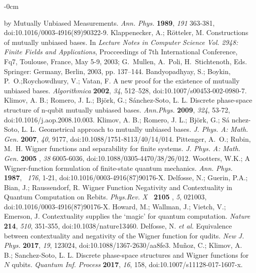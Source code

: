 \documentclass[quantumrep,article,submit,pdftex,moreauthors]{Definitions/mdpi}
\begin{document}
\begin{adjustwidth}{-\extralength}{0cm}
\begin{thebibliography}{999}
by Mutually Unbiased Measurements. \textit{Ann. Phys.} \textbf{1989}, 
\textit{191} 363-381, doi:10.1016/0003-4916(89)90322-9.
 Klappenecker, A.; R{\"{o}}tteler, M. Constructions of
mutually unbiased bases. In \textit{Lecture Notes in Computer Science Vol.
2948: Finite Fields and Applications}, Procceedings of 7th International
Conference, Fq7, Toulouse, France, May 5-9, 2003; G.~Mullen, A.~Poli,
H.~Stichtenoth, Eds. Springer: Germany, Berlin, 2003, pp. 137--144.
 Bandyopadhyay, S.; Boykin, P.~O.;Roychowdhury,
V.; Vatan, F. A new proof for the existence of mutually unbiased bases. 
\textit{Algorithmica} \textbf{2002}, \textit{34}, 512--528,
doi:10.1007/s00453-002-0980-7.
 Klimov, A. B.; Romero, J. L.; Bj\"{o}rk, G.; S\'{a}nchez-Soto,
L. L. Discrete phase-space structure of n-qubit mutually unbiased bases. 
\textit{Ann.Phys.} \textbf{2009}, \textit{324}, 53-72,
doi:10.1016/j.aop.2008.10.003.
 Klimov, A. B.; Romero, J. L.; Bj{\"{o}}rk, G.; S{\'{a}}%
nchez-Soto, L. L. Geometrical approach to mutually unbiased bases. \textit{%
J. Phys. A: Math. Gen.} \textbf{2007}, \textit{40}, 9177,
doi:10.1088/1751-8113/40/14/014.
 Pittenger, A.~O.; Rubin, M.~H. Wigner functions and
separability for finite systems. \textit{J. Phys. A: Math. Gen.} \textbf{2005%
}, \textit{38} 6005-6036, doi:10.1088/0305-4470/38/26/012.
 Wootters, W.K.; A Wigner-function formulation of
finite-state quantum mechanics. \textit{Ann. Phys.} \textbf{1987}, \textit{\
176}, 1-21, doi:10.1016/0003-4916(87)90176-X.
 Delfosse, N.; Guerin, P.A.; Bian, J.; Raussendorf, R. Wigner
Function Negativity and Contextuality in Quantum Computation on Rebits. 
\textit{Phys.Rev. X} \textbf{\ 2105 }, \textit{5}, 021003,
doi:10.1016/0003-4916(87)90176-X.
 Howard, M.; Wallman, J.; Vietch, V.; Emerson, J.
Contextuality supplies the `magic' for quantum computation. \textit{Nature}
\textbf{214}, \textit{510}, 351-355, doi:10.1038/nature13460.
 Delfosse, N. \textit{et al.} Equivalence between
contextuality and negativity of the Wigner function for qudits. \textit{New
J. Phys.} \textbf{2017}, \textit{19}, 123024, doi:10.1088/1367-2630/aa8fe3.
 Mu\~noz, C.; Klimov, A. B.; Sanchez-Soto, L. L. Discrete
phase-space structures and Wigner functions for $N$ qubits. \textit{Quantum
Inf. Process} \textbf{2017}, \textit{16}, 158, doi:10.1007/s11128-017-1607-x.

\end{thebibliography}
\end{adjustwidth}
\end{document}
